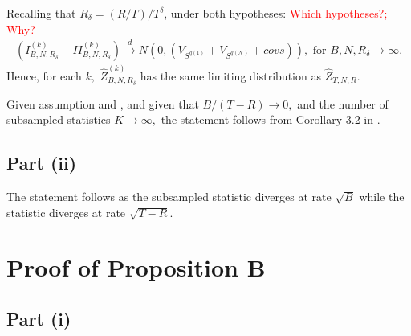 Recalling that $R_\delta=(R/T)/T^{\delta}$, under both hypotheses: \textcolor{red}{Which hypotheses?; Why?}
\begin{align*}
\left( I_{B,N,R_\delta}^{(k)}-II_{B,N,R_\delta}^{(k)}\right) \overset{d}{\rightarrow }N\left( 0,\left( V_{S^{q(1)}}+V_{S^{q(\mathcal{N})}}+ covs \right) \right) ,\text{ for }B,N,R_\delta\rightarrow \infty.
\end{align*}
Hence, for each $k,$ $\widehat{Z}_{B,N,R_\delta}^{(k)}$ has the same limiting distribution as $\widehat{Z}_{T,N,R}.$ 

Given assumption %
and %
, and given that $B/(T-R)\rightarrow 0,$ and the number of subsampled statistics $K\rightarrow \infty ,$ the statement follows from Corollary 3.2 in \cite{politis1992general}. 

\subsection{Part (ii)}

The statement follows as the subsampled statistic diverges at rate $\sqrt{B}$ while the statistic diverges at rate $\sqrt{T-R}.$


\section{Proof of Proposition B}

\subsection{Part (i)}


